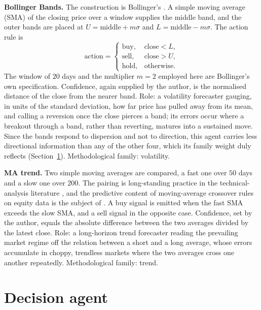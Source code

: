 \textbf{Bollinger Bands.} The construction is Bollinger's \cite{bollinger2001}. A simple moving average (SMA) of the closing price over a window supplies the middle band, and the outer bands are placed at $U = \mathrm{middle} + m\sigma$ and $L = \mathrm{middle} - m\sigma$. The action rule is
\begin{equation}
\mathrm{action} =
\begin{cases}
\mathrm{buy}, & \mathrm{close} < L, \\
\mathrm{sell}, & \mathrm{close} > U, \\
\mathrm{hold}, & \mathrm{otherwise}.
\end{cases}
\label{eq:bollinger_rule}
\end{equation}
The window of $20$ days and the multiplier $m = 2$ employed here are Bollinger's own specification. Confidence, again supplied by the author, is the normalised distance of the close from the nearer band. Role: a volatility forecaster gauging, in units of the standard deviation, how far price has pulled away from its mean, and calling a reversion once the close pierces a band; its errors occur where a breakout through a band, rather than reverting, matures into a sustained move. Since the bands respond to dispersion and not to direction, this agent carries less directional information than any of the other four, which its family weight duly reflects (Section~\ref{subsec:decision}). Methodological family: volatility.

\textbf{MA trend.} Two simple moving averages are compared, a fast one over $50$ days and a slow one over $200$. The pairing is long-standing practice in the technical-analysis literature \cite{murphy1999}, and the predictive content of moving-average crossover rules on equity data is the subject of \cite{brock1992}. A buy signal is emitted when the fast SMA exceeds the slow SMA, and a sell signal in the opposite case. Confidence, set by the author, equals the absolute difference between the two averages divided by the latest close. Role: a long-horizon trend forecaster reading the prevailing market regime off the relation between a short and a long average, whose errors accumulate in choppy, trendless markets where the two averages cross one another repeatedly. Methodological family: trend.

\section{Decision agent}\label{subsec:decision}

